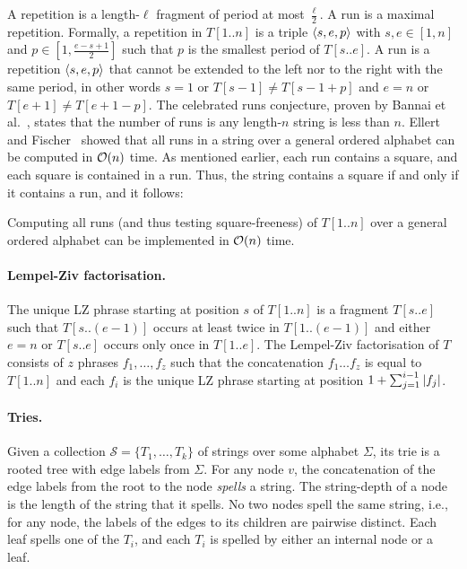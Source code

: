 A repetition is a length-$\ell$ fragment of period at most $\frac \ell 2$. 
A run is a maximal repetition. 
Formally, a repetition in $T[1..n]$ is a triple $\left\langle s, e, p\right\rangle$ with $s,e \in [1, n]$ and $p \in [1, \frac{e - s + 1}{2}]$ such that $p$ is the smallest period of $T[s..e]$. 
A run is a repetition $\left\langle s, e, p\right\rangle$ that cannot be extended to the left nor to the right with the same period, in other words
$s = 1$ or $T[s-1]\neq T[s-1+p]$ and $e = n$ or $T[e+1] \neq T[e+1-p]$.
The celebrated runs conjecture, proven by Bannai et al.~\cite{Bannai2017}, states
that the number of runs is any length-$n$ string is less than $n$.
Ellert and Fischer~\cite{Ellert2021} showed that all runs in a string over a general ordered alphabet can be computed in $\mathcal{O}(n)$ time.
As mentioned earlier, each run contains a square, and each square is contained in a run.
Thus, the string contains a square if and only if it contains a run, and it follows:
\begin{theorem}
\label{lem:fasterclassical}
Computing all runs (and thus testing square-freeness) of $T[1..n]$ over a general ordered alphabet can be implemented in $\mathcal{O}(n)$ time.
\end{theorem}

\paragraph{Lempel-Ziv factorisation.}
The unique LZ phrase starting at position $s$ of $T[1..n]$ is a fragment $T[s..e]$ such that $T[s..(e-1)]$ occurs at least twice in $T[1..(e-1)]$ and either $e = n$ or $T[s..e]$ occurs only once in $T[1..e]$.
The Lempel-Ziv factorisation of $T$ consists of $z$ phrases $f_{1},\ldots,f_{z}$ such that the concatenation $f_{1}\ldots f_{z}$ is equal to $T[1..n]$ and each $f_{i}$ is the unique LZ phrase starting at position $1 + \sum_{j=1}^{i - 1}\left\lvert f_{j}\right\rvert$.

\paragraph{Tries.}
Given a collection $\mathcal S = \{T_1, \dots, T_k\}$ of strings over some alphabet $\Sigma$, its trie is a rooted tree with edge labels from $\Sigma$. 
For any node $v$, the concatenation of the edge labels from the root to the node \emph{spells} a string. 
The string-depth of a node is the length of the string that it spells. 
No two nodes spell the same string, i.e., for any node, the labels of the edges to its children are pairwise distinct. Each leaf spells one of the $T_i$, and each $T_i$ is spelled by either an internal node or a leaf.

